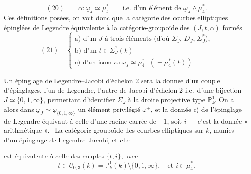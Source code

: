 \documentclass[11pt,a4paper]{article}
\begin{document}
\[
  (20) \qquad \alpha : \underline{\omega}_J \simeq \mu_4^*
  \qquad \text{i.e.\ d'un élément de } \underline{\omega}_J \wedge \mu_4^* .
\]
Ces définitions posées, on voit donc que la catégorie des
courbes elliptiques  épinglées de Legendre \struck{\ill{}}
 équivalente à la catégorie-groupoïde des   $(J, t, \alpha)$  formés
\[
  (21) \quad
  \begin{cases}
    \text{a) d'un $J$ à trois éléments (d'où $\Sigma_J$, $D_J$, $\Sigma_J^*$),} \\
    \text{b) d'un $t \in \Sigma_J^*(k)$} \\
    \text{c) d'un isom $\alpha : \underline{\omega}_J \simeq \mu_4^*$ \ \ $(= \mu_4^*(k))$}
  \end{cases}
\]

Un épinglage de Legendre--Jacobi d'échelon 2  sera la donnée d'un couple d'épinglages, l'un de Legendre, l'autre de
Jacobi d'échelon 2 i.e.\ d'une bijection $J \simeq \{0, 1, \infty\}$,
permettant d'identifier $\Sigma_J$ à la droite projective type
$\mathbb{P}^1_k$. On a alors dans
$\underline{\omega}_J \simeq \underline{\omega}_{\{0,1,\infty\}}$ un élément
\struck{\ill{}} privilégié $\omega^+$, et la donnée c) de l'épinglage de
Legendre équivaut  à celle d'une racine carrée
\struck{\ill{}} de $-1$, soit $i$ --- c'est la donnée « arithmétique ».
\ La catégorie-groupoïde des courbes
elliptiques sur $k$, munies d'un épinglage de Legendre--Jacobi,
  et elle

est équivalente à celle des couples $\{t, i\}$, avec
\[
  t \in U_{0,3}(k) = \mathbb{P}^1_k(k) \setminus \{0, 1, \infty\}, \quad \text{et } i \in \mu_4^* .
\]

\end{document}

